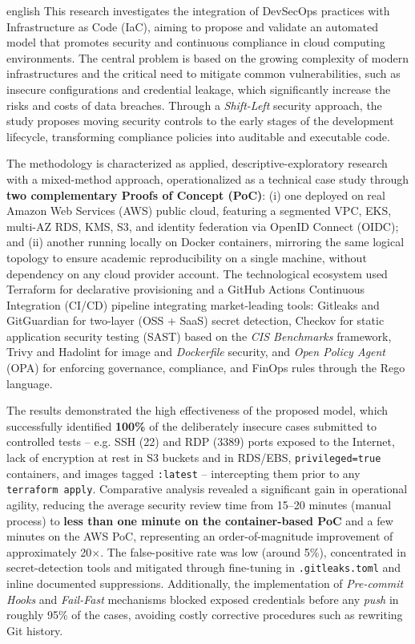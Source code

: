 \begin{resumo}[Abstract]
 \begin{otherlanguage*}{english}
  This research investigates the integration of DevSecOps practices with Infrastructure as Code (IaC), aiming to propose and validate an automated model that promotes security and continuous compliance in cloud computing environments. The central problem is based on the growing complexity of modern infrastructures and the critical need to mitigate common vulnerabilities, such as insecure configurations and credential leakage, which significantly increase the risks and costs of data breaches. Through a \textit{Shift-Left} security approach, the study proposes moving security controls to the early stages of the development lifecycle, transforming compliance policies into auditable and executable code.

The methodology is characterized as applied, descriptive-exploratory research with a mixed-method approach, operationalized as a technical case study through \textbf{two complementary Proofs of Concept (PoC)}: (i) one deployed on real Amazon Web Services (AWS) public cloud, featuring a segmented VPC, EKS, multi-AZ RDS, KMS, S3, and identity federation via OpenID Connect (OIDC); and (ii) another running locally on Docker containers, mirroring the same logical topology to ensure academic reproducibility on a single machine, without dependency on any cloud provider account. The technological ecosystem used Terraform for declarative provisioning and a GitHub Actions Continuous Integration (CI/CD) pipeline integrating market-leading tools: Gitleaks and GitGuardian for two-layer (OSS + SaaS) secret detection, Checkov for static application security testing (SAST) based on the \textit{CIS Benchmarks} framework, Trivy and Hadolint for image and \textit{Dockerfile} security, and \textit{Open Policy Agent} (OPA) for enforcing governance, compliance, and FinOps rules through the Rego language.

The results demonstrated the high effectiveness of the proposed model, which successfully identified \textbf{100\%} of the deliberately insecure cases submitted to controlled tests -- e.g. SSH (22) and RDP (3389) ports exposed to the Internet, lack of encryption at rest in S3 buckets and in RDS/EBS, \texttt{privileged=true} containers, and images tagged \texttt{:latest} -- intercepting them prior to any \texttt{terraform apply}. Comparative analysis revealed a significant gain in operational agility, reducing the average security review time from 15--20 minutes (manual process) to \textbf{less than one minute on the container-based PoC} and a few minutes on the AWS PoC, representing an order-of-magnitude improvement of approximately 20$\times$. The false-positive rate was low (around 5\%), concentrated in secret-detection tools and mitigated through fine-tuning in \texttt{.gitleaks.toml} and inline documented suppressions. Additionally, the implementation of \textit{Pre-commit Hooks} and \textit{Fail-Fast} mechanisms blocked exposed credentials before any \textit{push} in roughly 95\% of the cases, avoiding costly corrective procedures such as rewriting Git history.


\end{otherlanguage*}
\end{resumo}
